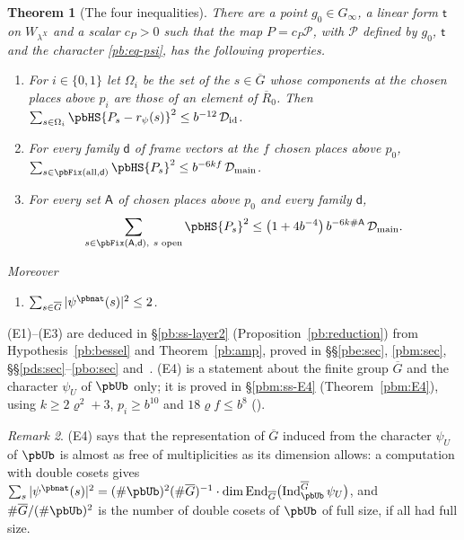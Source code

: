 \documentclass[10pt]{amsart}
\newtheorem{theorem}{Theorem}[section]
\theoremstyle{definition}
\theoremstyle{remark}
\newtheorem{remark}[theorem]{Remark}
\providecommand{\auG}{\overline G}
\providecommand{\auP}{\mathcal P}
\providecommand{\pbDid}{\mathcal D_{\mathrm{id}}}
\providecommand{\pbDmain}{\mathcal D_{\mathrm{main}}}
\providecommand{\pbR}{\overline R_0}
\providecommand{\pbrpsi}{r_\psi}
\begin{document}
\begin{theorem}[The four inequalities]\label{pb:est}
There are a point $g_0\in G_\infty$, a linear form $\mathsf t$ on $W_{\lambda^X}$ and a scalar
$c_P>0$ such that the map $P=c_P\auP$, with $\auP$ defined by $g_0$, $\mathsf t$ and the character
\eqref{pb:eq-psi}, has the following properties.
\begin{enumerate}
\item[(E1)] For $i\in\{0,1\}$ let $\Omega_i$ be the set of the $s\in\auG$ whose components at the
chosen places above $p_i$ are those of an element of $\pbR$. Then
$\sum_{s\in\Omega_i}\pbHS{P_s-\pbrpsi(s)}^2\le b^{-12}\,\pbDid$.
\item[(E2)] For every family $\mathsf d$ of frame vectors at the $f$ chosen places above $p_0$,
$\sum_{s\in\pbFix(\mathrm{all},\mathsf d)}\pbHS{P_s}^2\le b^{-6kf}\,\pbDmain$.
\item[(E3)] For every set $\mathsf A$ of chosen places above $p_0$ and every family $\mathsf d$,
\[
\sum_{s\in\pbFix(\mathsf A,\mathsf d),\ s\text{ open}}\pbHS{P_s}^2\le\bigl(1+4b^{-4}\bigr)\,b^{-6k
\#\mathsf A}\,\pbDmain .
\]
\end{enumerate}
Moreover
\begin{enumerate}
\item[(E4)] $\sum_{s\in\auG}|\psi^{\pbnat}(s)|^2\le2$.
\end{enumerate}
\end{theorem}
\smallskip\noindent(E1)--(E3) are deduced in \S\ref{pb:ss-layer2} (Proposition~\ref{pb:reduction}) from
Hypothesis~\ref{pb:bessel} and Theorem~\ref{pb:amp}, proved in \S\S\ref{pbe:sec}, \ref{pbm:sec},
\S\S\ref{pds:sec}--\ref{pbo:sec} and~{\cite[\S\S2--6]{P52}}. (E4) is a statement
about the finite group $\auG$ and the character $\psi_U$ of $\pbUb$ only; it is proved in \S\ref{pbm:ss-E4} (Theorem~\ref{pbm:E4}), using $k\ge2\varrho^2+3$, $p_i\ge b^{10}$ and $18\varrho f\le b^8$ ({\cite[Lemma~13.4(S7)]{P46}}).\par\smallskip

\begin{remark}\label{pb:rem-E4}
(E4) says that the representation of $\auG$ induced from the character $\psi_U$ of $\pbUb$ is
almost as free of multiplicities as its dimension allows: a computation with double cosets gives
$\sum_s|\psi^{\pbnat}(s)|^2=(\#\pbUb)^2(\#\auG)^{-1}\cdot\dim\operatorname{End}_{\auG}
\bigl(\operatorname{Ind}_{\pbUb}^{\auG}\psi_U\bigr)$, and $\#\auG/(\#\pbUb)^2$ is the number of
double cosets of $\pbUb$ of full size, if all had full size.
\end{remark}
\end{document}
